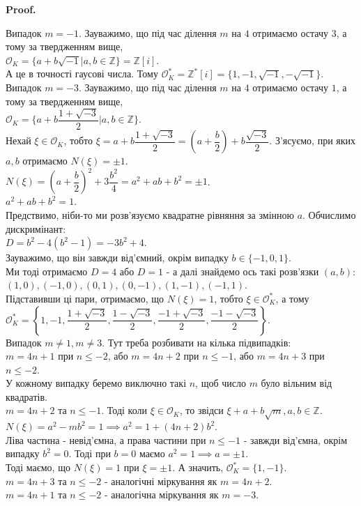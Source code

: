 \documentclass[a4paper, 10pt]{article}
\makeatletter
\theoremstyle{theoremdd}
\theoremstyle{theoremdd}
\theoremstyle{theoremdd}
\theoremstyle{theoremdd}
\theoremstyle{theoremdd}
\theoremstyle{theoremdd}
\theoremstyle{theoremdd}
\theoremstyle{theoremdd}
\renewenvironment{proof}[1][Proof.\\]{\par
\pushQED{\hfill \qed}%
\normalfont \topsep6\p@\@plus6\p@\relax
\trivlist
\item\relax
{\bfseries
#1\@addpunct{.}}\hspace\labelsep\ignorespaces
}{%
\popQED\endtrivlist\@endpefalse
}
\makeatother
\begin{document}
\begin{proof}
Випадок $m=-1$. Зауважимо, що під час ділення $m$ на $4$ отримаємо остачу $3$, а тому за твердженням вище,\\
$\mathcal{O}_K = \{a+b\sqrt{-1} |a,b \in \mathbb{Z}\} = \mathbb{Z}[i]$.\\
А це в точності гаусові числа. Тому $\mathcal{O}_K^* = \mathbb{Z}^*[i] = \{1,-1, \sqrt{-1}, -\sqrt{-1}\}$.
\bigskip \\
Випадок $m = -3$. Зауважимо, що під час ділення $m$ на $4$ отримаємо остачу $1$, а тому за твердженням вище,\\
$\mathcal{O}_K = \{a+b \dfrac{1+\sqrt{-3}}{2} |a,b \in \mathbb{Z}\}$.\\
Нехай $\xi \in \mathcal{O}_K$, тобто $\xi = a + b \dfrac{1+\sqrt{-3}}{2} = \left( a + \dfrac{b}{2} \right) + b \dfrac{\sqrt{-3}}{2}$. З'ясуємо, при яких $a,b$ отримаємо $N(\xi) = \pm 1$.\\
$N(\xi) = \left( a + \dfrac{b}{2} \right)^2 + 3 \dfrac{b^2}{4} = a^2 + ab + b^2 = \pm 1$.\\
$a^2 + ab + b^2 = 1$.\\
Предствимо, ніби-то ми розв'язуємо квадратне рівняння за змінною $a$. Обчислимо дискримінант:\\
$D = b^2 - 4(b^2-1) = -3b^2+4$.\\
Зауважимо, що він завжди від'ємний, окрім випадку $b \in \{-1,0,1\}$.\\
Ми тоді отримаємо $D = 4$ або $D = 1$ - а далі знайдемо ось такі розв'язки $(a,b)$:\\
$(1,0), (-1,0), (0,1), (0,-1), (1,-1), (-1,1)$.\\
Підставивши ці пари, отримаємо, що $N(\xi) = 1$, тобто $\xi \in \mathcal{O}^*_K$, а тому\\
$\mathcal{O}^*_K = \left\{ 1,-1,\dfrac{1+\sqrt{-3}}{2},\dfrac{1-\sqrt{-3}}{2},\dfrac{-1+\sqrt{-3}}{2}, \dfrac{-1-\sqrt{-3}}{2} \right\}$.
\bigskip \\
Випадок $m \neq 1, m \neq 3$. Тут треба розбивати на кілька підвипадків: \\
$m = 4n+1$ при $n \leq -2$, або $m = 4n+2$ при $n \leq -1$, або $m = 4n+3$ при $n \leq -2$.\\
У кожному випадку беремо виключно такі $n$, щоб число $m$ було вільним від квадратів.\\
$m = 4n+2$ та $n \leq -1$. Тоді коли $\xi \in \mathcal{O}_K$, то звідси $\xi + a + b\sqrt{m}, a,b \in \mathbb{Z}$.\\
$N(\xi) = a^2 -mb^2 = 1 \implies a^2 = 1 + (4n+2)b^2$.\\
Ліва частина - невід'ємна, а права частини при $n \leq -1$ - завжди від'ємна, окрім випадку $b^2 = 0$. Тоді при $b=0$ маємо $a^2 = 1 \implies a = \pm 1$.\\
Тоді маємо, що $N(\xi) = 1$ при $\xi = \pm 1$. А значить, $\mathcal{O}^*_K = \{1,-1\}$.
\bigskip \\
$m = 4n+3$ та $n \leq -2$ - аналогічні міркування як $m=4n+2$.
\bigskip \\
$m = 4n+1$ та $n \leq -2$ - аналогічна міркування як $m = -3$.
\end{proof}
\end{document}
